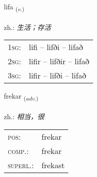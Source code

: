 \documentclass[frontgrid, backgrid]{flacards}\usepackage[]{graphicx}\usepackage[]{xcolor}
\begin{document}
{lifa \small{\textsubscript{(\textit{v.})}} \\[1ex] %
\textphonetic{[lɪːva]} \\
zh.: \emph{生活；存活} \\  [2ex]
\renewcommand*{\arraystretch}{0.8}
\begin{tabular}{p{1cm}l}
\textsc{1sg}: & lifi -- lifði -- lifað \\ 
\textsc{2sg}: & lifir -- lifðir -- lifað \\ 
\textsc{3sg}: & lifir -- lifði -- lifað \\ 
\end{tabular}
}

\renewcommand{\flhead}{\vskip5pt \fboxsep=0pt {\small\bfseries\footnotesize Atviksorð | 副词}}
\renewcommand{\fcfoot}{\vskip5pt \fboxsep=0pt \hspace{2pt}{\small\bfseries\footnotesize 1K}}

\renewcommand{\blhead}{\vskip5pt {\small\bfseries\footnotesize Atviksorð | 副词 }}
\renewcommand{\bcfoot}{\vskip5pt \hspace{2pt}{\small\bfseries\footnotesize 1K}}


{frekar \small{\textsubscript{(\textit{adv.})}} \\[1ex] %
\textphonetic{[frɛːkar]} \\
zh.: \emph{相当，很} \\  [2ex]
\renewcommand*{\arraystretch}{0.8}
\begin{tabular}{ll}
\textsc{pos}: & frekar \\ 
\textsc{comp.}: & frekar \\ 
\textsc{superl.}: & frekast \\
\end{tabular}
}

\renewcommand{\flhead}{\vskip5pt \fboxsep=0pt {\small\bfseries\footnotesize Nafnorð | 名词}}
\renewcommand{\fcfoot}{\vskip5pt \fboxsep=0pt \hspace{2pt}{\small\bfseries\footnotesize 1K}}
\end{document}
